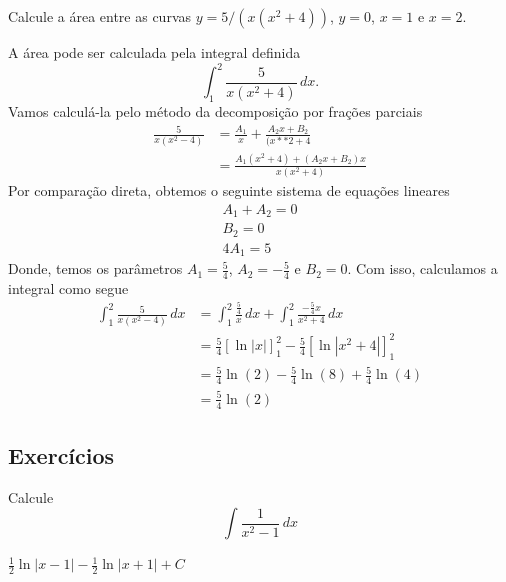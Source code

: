 \begin{exeresol}
  Calcule a área entre as curvas $y=5/(x(x^2+4))$, $y=0$, $x=1$ e $x=2$.
\end{exeresol}
\begin{resol}
  A área pode ser calculada pela integral definida
  \begin{equation}
    \int_{1}^{2}\frac{5}{x(x^2+4)}\,dx.
  \end{equation}
  Vamos calculá-la pelo método da decomposição por frações parciais
  \begin{align}
    \frac{5}{x(x^2-4)} &= \frac{A_1}{x} + \frac{A_2x+B_2}{(x**2+4}\\
                       &= \frac{A_1(x^2+4) + (A_2x+B_2)x}{x(x^2+4)}
  \end{align}
  Por comparação direta, obtemos o seguinte sistema de equações lineares
  \begin{gather}
    A_1+A_2=0\\
    B_2=0\\
    4A_1=5
  \end{gather}
  Donde, temos os parâmetros $A_1=\frac{5}{4}$, $A_2 = -\frac{5}{4}$ e $B_2=0$. Com isso, calculamos a integral como segue
  \begin{align}
    \int_{1}^{2}\frac{5}{x(x^2-4)}\,dx &= \int_1^2\frac{\frac{5}{4}}{x}\,dx + \int_1^2\frac{-\frac{5}{4}x}{x^2+4}\,dx\\
                                       &= \frac{5}{4}\left[\ln|x|\right]_1^2 - \frac{5}{4}\left[\ln|x^2+4|\right]_1^2\\
                                       &= \frac{5}{4}\ln(2) - \frac{5}{4}\ln(8) + \frac{5}{4}\ln(4)\\
                                       &= \frac{5}{4}\ln(2)
  \end{align}
\end{resol}

\subsection*{Exercícios}

\begin{exer}
  Calcule
  \begin{equation}
    \int\frac{1}{x^2-1}\,dx
  \end{equation}
\end{exer}
\begin{resp}
  $\frac{1}{2}\ln|x-1| - \frac{1}{2}\ln|x+1| + C$
\end{resp}

